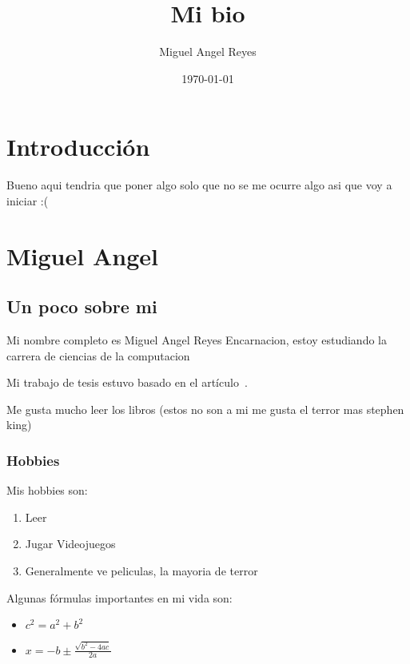 

\author{Miguel Angel Reyes}
\title{Mi bio}
\date{\today}

\renewcommand{\labelitemi}{$\bullet$}




\maketitle
\tableofcontents
{}

\listoffigures
{}

\listoftables
{}

\chapter*{Introducción}

Bueno aqui tendria que poner algo solo que no se me ocurre algo asi que voy a iniciar :(
\chapter{Miguel Angel}

\section{Un poco sobre mi}
Mi nombre completo es Miguel Angel Reyes Encarnacion, estoy estudiando la carrera de ciencias de la computacion

Mi trabajo de tesis estuvo basado en el artículo~\cite{Floodlight}.

Me gusta mucho leer los libros (estos no son a mi me gusta el terror mas stephen king)~\cite{torres,comunidad,retorno}

\subsection{Hobbies}
Mis hobbies son:
\begin{enumerate}
\item Leer
\item Jugar Videojuegos
\item Generalmente ve peliculas, la mayoria de terror
\end{enumerate}

\newpage
Algunas fórmulas importantes en mi vida son:
\begin{itemize}
\item $c^2 = a^2 + b^2$
\item $x=-b \pm \frac{\sqrt{b^2-4ac}}{2a}$
\end{itemize}

